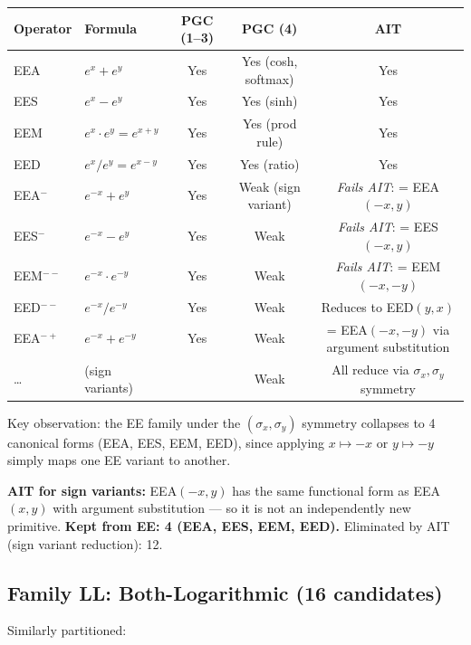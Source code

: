 \documentclass[11pt]{article}
\begin{document}
\begin{center}
\begin{tabular}{llccc}
\toprule
Operator & Formula & PGC (1--3) & PGC (4) & AIT \\
\midrule
EEA & $e^x + e^y$         & Yes & Yes (cosh, softmax) & Yes \\
EES & $e^x - e^y$         & Yes & Yes (sinh) & Yes \\
EEM & $e^x \cdot e^y = e^{x+y}$ & Yes & Yes (prod rule) & Yes \\
EED & $e^x / e^y = e^{x-y}$ & Yes & Yes (ratio) & Yes \\
EEA$^-$ & $e^{-x} + e^y$  & Yes & Weak (sign variant) & \emph{Fails AIT}: = EEA$(−x, y)$ \\
EES$^-$ & $e^{-x} - e^y$  & Yes & Weak & \emph{Fails AIT}: = EES$(−x, y)$ \\
EEM$^{--}$ & $e^{-x}\cdot e^{-y}$ & Yes & Weak & \emph{Fails AIT}: = EEM$(-x,-y)$ \\
EED$^{--}$ & $e^{-x}/e^{-y}$ & Yes & Weak & Reduces to EED$(y,x)$ \\
EEA$^{-+}$ & $e^{-x}+e^{-y}$ & Yes & Weak & = EEA$(-x,-y)$ via argument substitution \\
\ldots & (sign variants) & & Weak & All reduce via $\sigma_x, \sigma_y$ symmetry \\
\bottomrule
\end{tabular}
\end{center}

\noindent Key observation: the EE family under the $(\sigma_x, \sigma_y)$ symmetry
collapses to 4 canonical forms (EEA, EES, EEM, EED), since applying $x \mapsto -x$
or $y \mapsto -y$ simply maps one EE variant to another.

\textbf{AIT for sign variants:} EEA$(-x, y)$ has the same functional form as EEA$(x,y)$
with argument substitution --- so it is not an independently new primitive.
\textbf{Kept from EE: 4 (EEA, EES, EEM, EED).}
Eliminated by AIT (sign variant reduction): 12.

\subsection{Family LL: Both-Logarithmic (16 candidates)}

Similarly partitioned:
\end{document}
